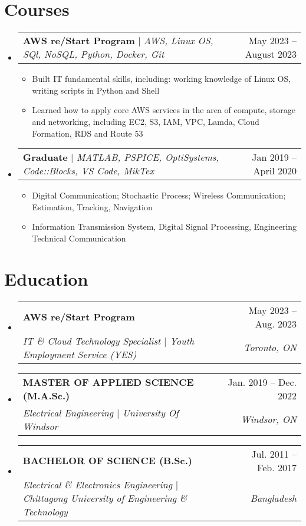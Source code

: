 \documentclass[letterpaper,11pt]{article}
\makeatletter
\newcommand{\resumeItem}[1]{
  \item\small{
    {#1 \vspace{-2pt}}
  }
}
\newcommand{\resumeSubheading}[4]{
  \vspace{-2pt}\item
    \begin{tabular*}{0.97\textwidth}[t]{l@{\extracolsep{\fill}}r}
      \textbf{#1} & #2 \\
      \textit{\small#3} & \textit{\small #4} \\
    \end{tabular*}\vspace{-7pt}
}
\newcommand{\resumeProjectHeading}[2]{
    \item
    \begin{tabular*}{0.97\textwidth}{l@{\extracolsep{\fill}}r}
      \small#1 & #2 \\
    \end{tabular*}\vspace{-7pt}
}
\newcommand{\resumeSubHeadingListStart}{\begin{itemize}[leftmargin=0.15in, label={}]}
\newcommand{\resumeSubHeadingListEnd}{\end{itemize}}
\newcommand{\resumeItemListStart}{\begin{itemize}}
\newcommand{\resumeItemListEnd}{\end{itemize}\vspace{-5pt}}
\makeatother
\begin{document}
\section{Courses}
    \resumeSubHeadingListStart
      \resumeProjectHeading
          {\textbf{AWS re/Start Program} $|$ \emph{AWS, Linux OS,  SQl, NoSQL, Python, Docker, Git}}{May 2023 -- August 2023}
          \resumeItemListStart
            \resumeItem{Built IT fundamental skills, including: working knowledge of Linux OS, writing scripts in
            Python and Shell}
            \resumeItem{Learned how to apply core AWS services in the area of compute, storage and
            networking, including EC2, S3, IAM, VPC, Lamda, Cloud Formation, RDS and Route 53}
          \resumeItemListEnd
          \resumeProjectHeading
          {\textbf{Graduate} $|$ \emph{MATLAB, PSPICE, OptiSystems, Code::Blocks, VS Code, MikTex}}{Jan 2019 -- April 2020}
          \resumeItemListStart
            \resumeItem{Digital Communication; Stochastic Process; Wireless Communication; Estimation, Tracking, Navigation }
            \resumeItem{Information Transmission System, Digital Signal Processing, Engineering Technical Communication}
          \resumeItemListEnd
    \resumeSubHeadingListEnd
%

\section{Education}
  \resumeSubHeadingListStart
    \resumeSubheading
    {AWS re/Start Program}{May 2023 -- Aug. 2023}
    {IT \texorpdfstring{\&}{and} Cloud Technology Specialist $|$ Youth Employment Service (YES)}{Toronto, ON}
    \resumeSubheading
      {MASTER OF APPLIED SCIENCE (M.A.Sc.) }{Jan. 2019 -- Dec. 2022}
      {Electrical Engineering $|$ University Of Windsor }{Windsor, ON}
    \resumeSubheading
      {BACHELOR OF SCIENCE (B.Sc.) }{Jul. 2011 -- Feb. 2017 } 
      {Electrical \texorpdfstring{\&}{and} Electronics Engineering $|$ Chittagong University of Engineering \texorpdfstring{\&}{and} Technology }{Bangladesh}
  \resumeSubHeadingListEnd

\end{document}
